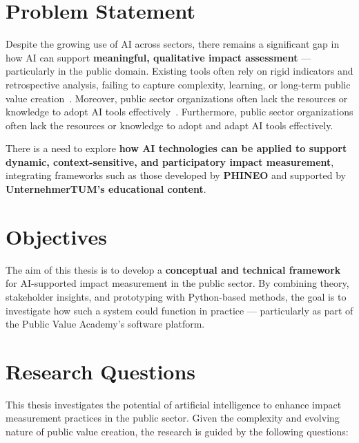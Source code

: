 \section{Problem Statement}\label{sec:problem-statement}
Despite the growing use of AI across sectors, there remains a significant gap in how AI can support \textbf{meaningful, qualitative impact assessment} — particularly in the public domain.
Existing tools often rely on rigid indicators and retrospective analysis, failing to capture complexity, learning, or long-term public value creation~\parencite{ebrahim2014impact, patton2011developmental}.
Moreover, public sector organizations often lack the resources or knowledge to adopt AI tools effectively~\parencite{mikhaylov2018ai}.
Furthermore, public sector organizations often lack the resources or knowledge to adopt and adapt AI tools effectively.

There is a need to explore \textbf{how AI technologies can be applied to support dynamic, context-sensitive, and participatory impact measurement}, integrating frameworks such as those developed by \textbf{PHINEO} and supported by \textbf{UnternehmerTUM’s educational content}.

\section{Objectives}\label{sec:objectives}
The aim of this thesis is to develop a \textbf{conceptual and technical framework} for AI-supported impact measurement in the public sector.
By combining theory, stakeholder insights, and prototyping with Python-based methods, the goal is to investigate how such a system could function in practice — particularly as part of the Public Value Academy’s software platform.

\section{Research Questions}\label{sec:research-questions}

This thesis investigates the potential of artificial intelligence to enhance impact measurement practices in the public sector.
Given the complexity and evolving nature of public value creation, the research is guided by the following questions:

